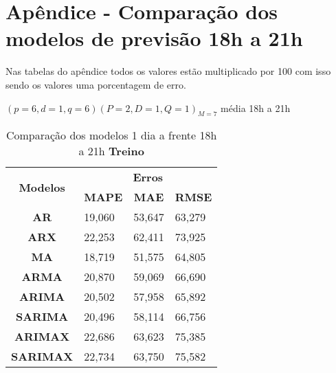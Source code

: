 
\section{Ap\^endice - Compara\c c\~ao dos modelos de previs\~ao 18h a 21h}\label{sec:comtb18}

Nas tabelas do apêndice todos os valores estão multiplicado por 100 com isso sendo os valores uma porcentagem de erro.

	$(p = 6,d = 1,q = 6) (P = 2,D = 1,Q = 1)_{M = 7}$ média 18h a 21h
	\begin{table}[H]
		\centering
		\caption{Comparação dos modelos 1 dia a frente 18h a 21h \textbf{Treino} }\label{tb:1-18trn}
\begin{tabular}{@{}clll@{}}
	\toprule
	\multirow{2}{*}{\textbf{Modelos}} & \multicolumn{3}{c}{\textbf{Erros}}                                                                       \\ \cmidrule(l){2-4} 
	& \multicolumn{1}{c}{\textbf{MAPE}} & \multicolumn{1}{c}{\textbf{MAE}} & \multicolumn{1}{c}{\textbf{RMSE}} \\ \hline
	\textbf{AR}                       & 19,060                            & 53,647                           & 63,279                            \\
	\textbf{ARX}                      & 22,253                            & 62,411                           & 73,925                            \\
	\textbf{MA}                       & 18,719                            & 51,575                           & 64,805                            \\
	\textbf{ARMA}                     & 20,870                            & 59,069                           & 66,690                            \\
	\textbf{ARIMA}                    & 20,502                            & 57,958                           & 65,892                            \\
	\textbf{SARIMA}                   & 20,496                            & 58,114                           & 66,756                            \\
	\textbf{ARIMAX}                   & 22,686                            & 63,623                           & 75,385                            \\
	\textbf{SARIMAX}                  & 22,734                            & 63,750                           & 75,582                            \\

\end{tabular}
\end{table}
